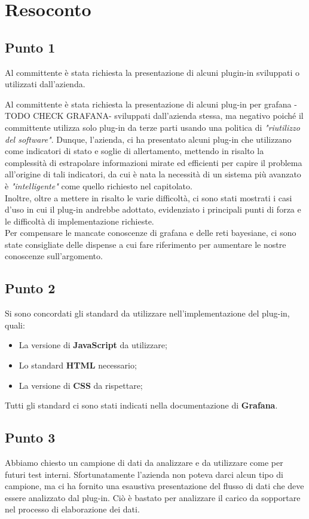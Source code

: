 \section{Resoconto}

\subsection{Punto 1}
Al committente è stata richiesta la presentazione di alcuni plugin-in sviluppati o utilizzati dall'azienda. 

Al committente è stata richiesta la presentazione di alcuni plug-in  per grafana -TODO CHECK GRAFANA- sviluppati dall'azienda stessa, ma negativo poiché il committente utilizza solo plug-in da terze parti usando una politica di \textit{"riutilizzo del software"}. Dunque, l'azienda, ci ha presentato alcuni plug-in che utilizzano come indicatori di stato e soglie di allertamento, mettendo
in risalto la complessità di estrapolare informazioni mirate ed efficienti per capire il problema all'origine di tali indicatori, 
da cui è nata la necessità di un sistema più avanzato è \textit{"intelligente"} come quello richiesto nel capitolato. \\
Inoltre, oltre a mettere in risalto le varie difficoltà, ci sono stati mostrati i casi d'uso in cui il plug-in andrebbe adottato, evidenziato i principali punti di forza e le difficoltà di implementazione
richieste.\\ 
Per compensare le mancate conoscenze di grafana e delle reti bayesiane, ci sono state consigliate delle dispense a cui fare riferimento per aumentare le nostre conoscenze sull'argomento. 

\subsection{Punto 2}
Si sono concordati gli standard da utilizzare nell'implementazione del plug-in, quali:
\begin{itemize}
	\item La versione di \textbf{JavaScript} da utilizzare; 
	\item Lo standard \textbf{HTML} necessario; 
	\item La versione di \textbf{CSS} da rispettare; 
\end{itemize}
Tutti gli standard ci sono stati indicati nella documentazione di \textbf{Grafana}.

\subsection{Punto 3}
Abbiamo chiesto un campione di dati da analizzare e da utilizzare come  per 
futuri test interni. Sfortunatamente l'azienda non poteva darci alcun tipo di campione, ma ci ha fornito 
una esaustiva presentazione del flusso di dati che deve essere analizzato dal plug-in.
Ciò è bastato per analizzare il carico da sopportare nel processo di elaborazione dei dati. 

